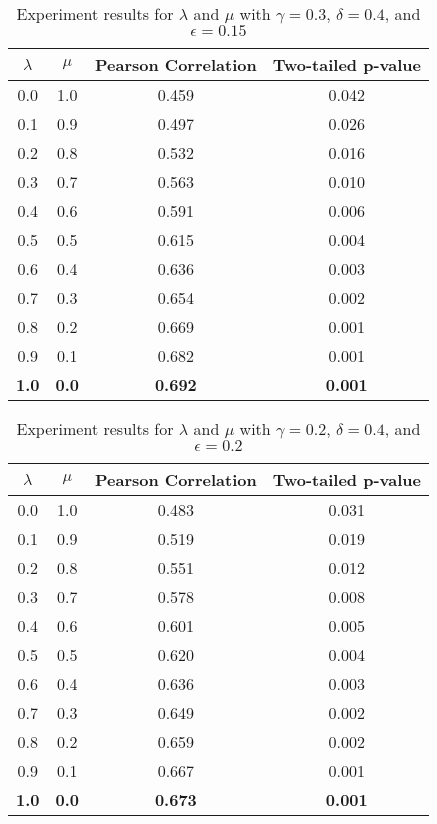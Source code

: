 \documentclass{article}
\begin{document}
\begin{table}[h!]
\caption{Experiment results for $\lambda$ and $\mu$ with $\gamma = 0.3$, $\delta = 0.4$, and $\epsilon = 0.15$}
\centering
\begin{tabular}{|c|c||c|c|}
	\hline
	$\lambda$ & $\mu$ & Pearson Correlation & Two-tailed p-value \\
	\hline
	0.0 & 1.0 & 0.459 & 0.042 \\
	0.1 & 0.9 & 0.497 & 0.026 \\
	0.2 & 0.8 & 0.532 & 0.016 \\
	0.3 & 0.7 & 0.563 & 0.010 \\
	0.4 & 0.6 & 0.591 & 0.006 \\
	0.5 & 0.5 & 0.615 & 0.004 \\
	0.6 & 0.4 & 0.636 & 0.003 \\
	0.7 & 0.3 & 0.654 & 0.002 \\
	0.8 & 0.2 & 0.669 & 0.001 \\
	0.9 & 0.1 & 0.682 & 0.001 \\
	\textbf{1.0} & \textbf{0.0} & \textbf{0.692} & \textbf{0.001} \\
	\hline
\end{tabular}
\label{table:lambdamuresults1}
\end{table}

\begin{table}[h!]
\caption{Experiment results for $\lambda$ and $\mu$ with $\gamma = 0.2$, $\delta = 0.4$, and $\epsilon = 0.2$}
\centering
\begin{tabular}{|c|c||c|c|}
	\hline
	$\lambda$ & $\mu$ & Pearson Correlation & Two-tailed p-value \\
	\hline
	0.0 & 1.0 & 0.483 & 0.031 \\
	0.1 & 0.9 & 0.519 & 0.019 \\
	0.2 & 0.8 & 0.551 & 0.012 \\
	0.3 & 0.7 & 0.578 & 0.008 \\
	0.4 & 0.6 & 0.601 & 0.005 \\
	0.5 & 0.5 & 0.620 & 0.004 \\
	0.6 & 0.4 & 0.636 & 0.003 \\
	0.7 & 0.3 & 0.649 & 0.002 \\
	0.8 & 0.2 & 0.659 & 0.002 \\
	0.9 & 0.1 & 0.667 & 0.001 \\
	\textbf{1.0} & \textbf{0.0} & \textbf{0.673} & \textbf{0.001} \\	
	\hline
\end{tabular}
\label{table:lambdamuresults2}
\end{table}
\end{document}
